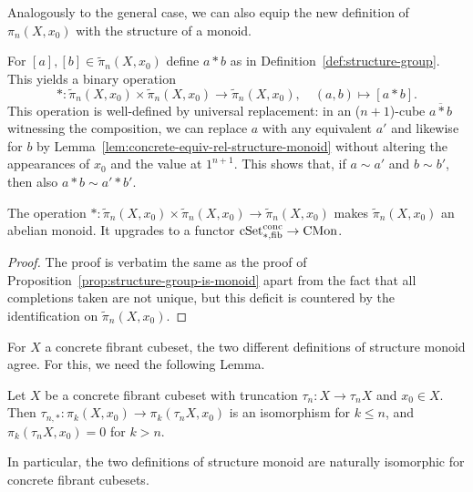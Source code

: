 Analogously to the general case, we can also equip the new definition of $\pi_n(X,x_0)$
with the structure of a monoid.

\begin{construction}\label{cons:concrete-structure-monoid-mult}
For $[a],[b]\in\tilde{\pi}_n(X,x_0)$ define $a*b$ as in Definition~\ref{def:structure-group}.
This yields a binary operation
\[
    *\colon\tilde{\pi}_n(X,x_0)\times\tilde{\pi}_n(X,x_0)\to\tilde{\pi}_n(X,x_0),\quad (a,b)\mapsto [a*b].
\]
This operation is well-defined by universal replacement:
in an ($n+1$)-cube $\overline{a*b}$ witnessing the composition,
we can replace $a$ with any equivalent $a'$ and likewise for $b$
by Lemma~\ref{lem:concrete-equiv-rel-structure-monoid}
without altering the appearances of $x_0$ and the value at $1^{n+1}$.
This shows that, if $a\sim a'$ and $b\sim b'$, then also $a*b\sim a'*b'$.
\end{construction}

\begin{proposition}\label{prop:concrete-structure-group-is-monoid}
The operation $*\colon\tilde{\pi}_n(X,x_0)\times\tilde{\pi}_n(X,x_0)\to\tilde{\pi}_n(X,x_0)$ makes $\tilde{\pi}_n(X,x_0)$
an abelian monoid.
It upgrades to a functor $\mathrm{cSet}^\mathrm{conc}_{\ast,\mathrm{fib}}\to\mathrm{CMon}$.
\end{proposition}

\begin{proof}
The proof is verbatim the same as the proof of Proposition~\ref{prop:structure-group-is-monoid} apart from the fact that all completions taken are not unique,
but this deficit is countered by the identification on $\tilde{\pi}_n(X,x_0)$.
\end{proof}

For $X$ a concrete fibrant cubeset, the two different definitions of structure monoid agree.
For this, we need the following Lemma.

\begin{proposition}\label{prop:trunc-structure-monoid}
Let $X$ be a concrete fibrant cubeset with truncation $\tau_n\colon X\to\tau_n X$ and $x_0\in X$.
Then $\tau_{n,\ast}\colon\pi_k(X,x_0)\to\pi_k(\tau_n X,x_0)$ is an isomorphism for $k\leq n$,
and $\pi_k(\tau_n X,x_0) = 0$ for $k > n$.

In particular, the two definitions of structure monoid are naturally isomorphic for concrete fibrant cubesets.
\end{proposition}

